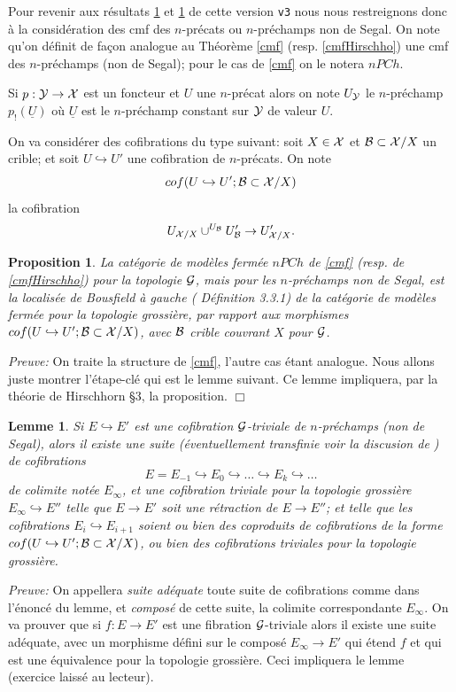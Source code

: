 \documentclass[12pt]{article}
\newcommand{\eop}{\hfill $\Box$\vspace{.1in}}
\newtheorem{proposition}[lemma]{Proposition}
\newtheorem{lemme}[lemma]{Lemme}
\newcommand{\Gg}{{\cal G}}
\newcommand{\Bb}{{\cal B}}
\newcommand{\Xx}{{\cal X}}
\newcommand{\Yy}{{\cal Y}}
\begin{document}
Pour revenir aux  r\'esultats \ref{naqualocaliser} et \ref{pourloc} de cette version
{\tt v3} nous
nous restreignons donc \`a la consid\'eration des cmf des $n$-pr\'ecats ou
$n$-pr\'echamps non de Segal. On note qu'on d\'efinit de fa\c{c}on analogue
au Th\'eor\`eme \ref{cmf} (resp. \ref{cmfHirschho}) une cmf des $n$-pr\'echamps
(non de Segal); pour le cas de \ref{cmf} on le notera $nPCh$. 

Si $p:\Yy \rightarrow \Xx$ est un foncteur et $U$ une $n$-pr\'ecat 
alors on note $U_{\Yy}$ le $n$-pr\'echamp
$p_!(\underline{U})$ o\`u
$\underline{U}$ est le $n$-pr\'echamp
constant sur $\Yy$ de valeur $U$.

On va consid\'erer des cofibrations du type suivant: soit $X\in \Xx$ et
$\Bb \subset \Xx /X$ un crible; et soit $U\hookrightarrow U'$ une cofibration de
$n$-pr\'ecats. On note
$$
cof(U\hookrightarrow U'; \Bb \subset
\Xx /X)
$$
la cofibration
$$
U_{\Xx /X} \cup ^{U_{\Bb}}U'_{\Bb} \rightarrow U'_{\Xx /X}.
$$


\begin{proposition}
\label{naqualocaliser}
La
cat\'egorie de mod\`eles ferm\'ee $nPCh$ de \ref{cmf} (resp. de \ref{cmfHirschho}) pour
la topologie $\Gg$, mais pour les $n$-pr\'echamps non de Segal,
est la  {\em localis\'ee de Bousfield \`a gauche}
(\cite{Hirschhorn} D\'efinition 3.3.1) de la cat\'egorie de mod\`eles
ferm\'ee pour
la topologie grossi\`ere, par rapport aux morphismes
$cof(U\hookrightarrow U'; \Bb \subset \Xx /X)$, avec $\Bb$
crible couvrant $X$ pour $\Gg$.
\end{proposition}
{\em Preuve:} On traite la structure de \ref{cmf}, l'autre cas \'etant
analogue.
Nous allons juste montrer l'\'etape-cl\'e qui est le lemme suivant.
Ce lemme
impliquera, par la th\'eorie de Hirschhorn \cite{Hirschhorn} \S 3, la
proposition.
\eop
\begin{lemme}
\label{pourloc}
Si $E\hookrightarrow E'$ est une cofibration $\Gg$-triviale de 
$n$-pr\'echamps (non de Segal),
alors  il
existe une
suite (\'e\-ven\-tu\-elle\-ment transfinie voir la discusion de
\cite{Hirschhorn}
\cite{DHK}
\cite{HoveyBook}) de cofibrations
$$
E=E_{-1} \hookrightarrow E_0
\hookrightarrow \ldots \hookrightarrow E_k \hookrightarrow \ldots
$$
de colimite not\'ee $E_{\infty}$, et une cofibration triviale pour
la topologie grossi\`ere $E_{\infty} \hookrightarrow E''$ telle que
$E\rightarrow E'$ soit une r\'etraction de $E\rightarrow E''$; et telle que les
cofibrations $E_i \hookrightarrow E_{i+1}$ soient  ou bien des coproduits de
cofibrations de la forme $cof(U\hookrightarrow U'; \Bb \subset \Xx /X)$,
ou bien
des cofibrations triviales pour la topologie grossi\`ere.
\end{lemme}
{\em  Preuve:}
On appellera {\em suite ad\'equate} toute suite de cofibrations comme dans
l'\'enonc\'e du lemme, et {\em compos\'e} de cette suite, la colimite
correspondante
$E_{\infty}$. On va prouver que si $f:E\rightarrow E'$ est une fibration
$\Gg$-triviale alors il existe une suite ad\'equate, avec un morphisme
d\'efini sur le compos\'e
$E_{\infty}\rightarrow E'$ qui \'etend $f$ et qui est une \'equivalence
pour la topologie grossi\`ere. Ceci impliquera le lemme (exercice laiss\'e au
lecteur).
\end{document}

